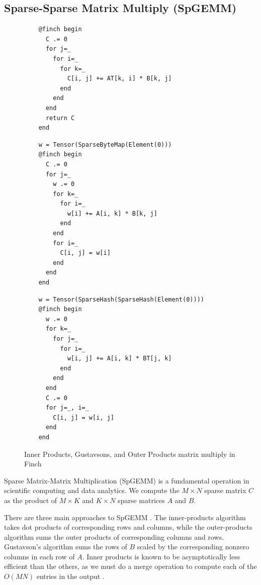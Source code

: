 \subsection{Sparse-Sparse Matrix Multiply (SpGEMM)}
\begin{figure}
    \begin{minipage}{0.333\linewidth}
    \begin{verbatim}
    @finch begin
      C .= 0
      for j=_
        for i=_
          for k=_
            C[i, j] += AT[k, i] * B[k, j]
          end
        end
      end
      return C
    end
    \end{verbatim}
    \end{minipage}%
    \begin{minipage}{0.333\linewidth}
    \begin{verbatim}
    w = Tensor(SparseByteMap(Element(0)))
    @finch begin
      C .= 0
      for j=_
        w .= 0
        for k=_
          for i=_
            w[i] += A[i, k] * B[k, j]
          end
        end
        for i=_
          C[i, j] = w[i]
        end
      end
    end
    \end{verbatim}
    \end{minipage}%
    \begin{minipage}{0.333\linewidth}
    \begin{verbatim}
    w = Tensor(SparseHash(SparseHash(Element(0))))
    @finch begin
      w .= 0
      for k=_
        for j=_
          for i=_
            w[i, j] += A[i, k] * BT[j, k]
          end
        end
      end
      C .= 0
      for j=_, i=_
        C[i, j] = w[i, j]
      end
    end
    \end{verbatim}
    \end{minipage}
    \caption{Inner Products, Gustavsons, and Outer Products matrix multiply in Finch}\label{fig:spgemm_listing}
\end{figure}

Sparse Matrix-Matrix Multiplication (SpGEMM) is a fundamental operation in scientific computing and data analytics. 
We compute the $M \times N$ sparse matrix $C$ as the product of $M \times K$ and $K \times N$ sparse matrices $A$ and $B$.

There are three main approaches to SpGEMM \cite[Section 2.2]{zhang2021gamma}.
%
The inner-products algorithm takes dot products of corresponding rows and columns, while the outer-products algorithm sums the outer products of corresponding columns and rows.
%
Gustavson's algorithm sums the rows of $B$ scaled by the corresponding nonzero columns in each row of $A$.
%
Inner products is known to be asymptotically less efficient than the others, as we must do a merge operation to compute each of the $O(MN)$ entries in the output \cite{ahrens2022autoscheduling}.

